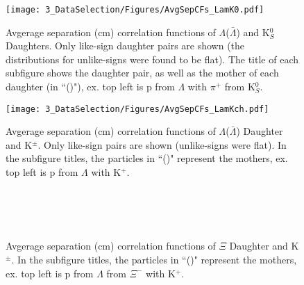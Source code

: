 \documentclass[../AnalysisNoteJBuxton.tex]{subfiles}
\begin{document}
\begin{figure}[h]
  \centering
  \texttt{[image: 3\_DataSelection/Figures/AvgSepCFs\_LamK0.pdf]}
  \caption[Avgerage Separation of $\Lambda$($\bar{\Lambda}$) and K$^{0}_{S}$ Daughters]{Avgerage separation (cm) correlation functions of $\Lambda$($\bar{\Lambda}$) and K$^{0}_{S}$ Daughters.  Only like-sign daughter pairs are shown (the distributions for unlike-signs were found to be flat).  The title of each subfigure shows the daughter pair, as well as the mother of each daughter (in ``()"),  ex. top left is p from $\Lambda$ with $\pi^{+}$ from K$^{0}_{S}$.}
  \label{fig:AvgSepLamK0}
\end{figure}

\begin{figure}[h]
  \centering
  \texttt{[image: 3\_DataSelection/Figures/AvgSepCFs\_LamKch.pdf]}
  \caption[Avgerage Separation of $\Lambda$($\bar{\Lambda}$) Daughter and K$^{\pm}$]{Avgerage separation (cm) correlation functions of $\Lambda$($\bar{\Lambda}$) Daughter and K$^{\pm}$.  Only like-sign pairs are shown (unlike-signs were flat).  In the subfigure titles, the particles in ``()" represent the mothers, ex. top left is p from $\Lambda$ with K$^{+}$.}
  \label{fig:AvgSepLamKch}
\end{figure}



\begin{figure}[h]
  \centering
  \\
  \\
  \\
  \caption[Avgerage Separation of $\Xi$ Daughters and K$^{\pm}$]{Avgerage separation (cm) correlation functions of $\Xi$ Daughter and K$^{\pm}$.  In the subfigure titles, the particles in ``()" represent the mothers, ex. top left is p from $\Lambda$ from $\Xi^{-}$ with K$^{+}$.}
  \label{fig:AvgSepXiKch}
\end{figure}
\end{document}
